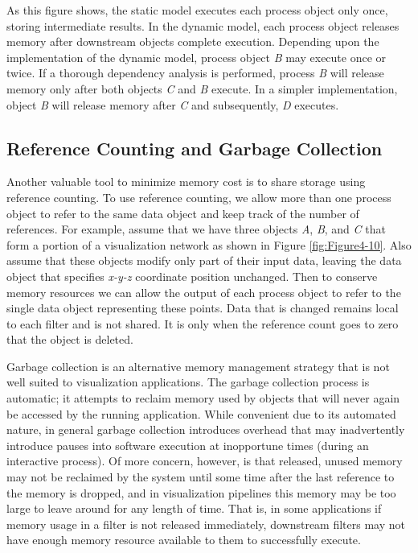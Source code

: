As this figure shows, the static model executes each process object only once, storing intermediate results. In the dynamic model, each process object releases memory after downstream objects complete execution. Depending upon the implementation of the dynamic model, process object \emph{B} may execute once or twice. If a thorough dependency analysis is performed, process \emph{B} will release memory only after both objects \emph{C} and \emph{B} execute. In a simpler implementation, object \emph{B} will release memory after \emph{C} and subsequently, \emph{D} executes.

\subsection{Reference Counting and Garbage Collection}
\label{subsec:reference_counting_garbage_collection}

Another valuable tool to minimize memory cost is to share storage using reference counting. To use reference counting, we allow more than one process object to refer to the same data object and keep track of the number of references. For example, assume that we have three objects \emph{A}, \emph{B}, and \emph{C} that form a portion of a visualization network as shown in Figure \ref{fig:Figure4-10}. Also assume that these objects modify only part of their input data, leaving the data object that specifies \emph{x-y-z} coordinate position unchanged. Then to conserve memory resources we can allow the output of each process object to refer to the single data object representing these points. Data that is changed remains local to each filter and is not shared. It is only when the reference count goes to zero that the object is deleted.

Garbage collection is an alternative memory management strategy that is not well suited to visualization applications. The garbage collection process is automatic; it attempts to reclaim memory used by objects that will never again be accessed by the running application. While convenient due to its automated nature, in general garbage collection introduces overhead that may inadvertently introduce pauses into software execution at inopportune times (during an interactive process). Of more concern, however, is that released, unused memory may not be reclaimed by the system until some time after the last reference to the memory is dropped, and in visualization pipelines this memory may be too large to leave around for any length of time. That is, in some applications if memory usage in a filter is not released immediately, downstream filters may not have enough memory resource available to them to successfully execute.

